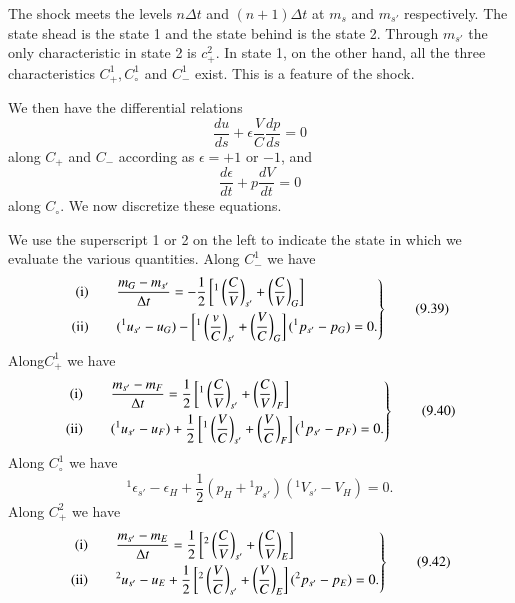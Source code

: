 The shock meets the levels $n\Delta t$ and $(n+1)\Delta t$ at $m_s$ and $m_{s'}$ respectively. The state shead is the state 1 and the state behind is the state 2. Through $m_{s'}$ the only characteristic in state 2 is $c^2_+$. In state 1, on the other hand, all the three characteristics $C^1_+, C^1_\circ$ and $C^1_-$ exist. This is a feature of the shock. 

We then have the differential relations
\begin{equation*}
\frac{du}{ds} + \epsilon \frac{V}{C} \frac{dp}{ds} = 0
\tag{9.37}\label{eq9.37}
\end{equation*}
along $C_+$ and $C_-$ according as $\epsilon = + 1$ or $-1$, and 
\begin{equation*}
\frac{d\epsilon}{dt} + p \frac{dV}{dt} = 0
\tag{9.38}\label{eq9.38}
\end{equation*}
along $C_\circ$. We now discretize these equations.

We use the superscript 1 or 2 on the left to indicate the state in which we evaluate the various quantities. Along $C^1_-$ we have
\begin{equation*}
\left. 
\begin{aligned}
{\rm (i)} & \qquad  \frac{m_G - m_{s'}}{\Delta t} = - \frac{1}{2}
\left[{}^1 \left(\frac{C}{V}\right)_{s'} + \left(\frac{C}{V}\right)_G \right]\\ 
{\rm (ii)} & \qquad ({}^1u_{s'} - u_G ) - \left[ {}^1
  \left(\frac{v}{C}\right)_{s'} + \left(\frac{V}{C}\right)_G \right]
({}^1 p_{s'} - p_G) = 0. 
\end{aligned}
\right\}
\tag{9.39}\label{eq9.39}
\end{equation*}
Along\pageoriginale $C^1_+$ we have 
\begin{equation*}
\left.
\begin{aligned}
{\rm (i)} & \qquad \frac{m_{s'} - m_F}{\Delta t} = \frac{1}{2}
\left[{}^1 \left(\frac{C}{V}\right)_{s'} + \left(\frac{C}{V}\right)_F
  \right]\\   
{\rm (ii)} & \qquad ({}^1 u_{s'} - u_F) + \frac{1}{2} \left[{}^1
  \left(\frac{V}{C}\right)_{s'} + \left(\frac{V}{C}\right)_F \right]
({}^1 p_{s'} - p_F) = 0. \\ 
\end{aligned}
\right\}\tag{9.40}\label{eq9.40}
\end{equation*}
Along $C^1_\circ$ we have 
\begin{equation*}
{}^1 \epsilon_{s'} - \epsilon_H + \frac{1}{2} (p_H + {}^1p_{s'} ) ({}^1 V_{s'} - V_H) = 0.  
\tag{9.41}\label{eq9.41}
\end{equation*}
Along $C^2_+$ we have 
\begin{equation*}
\left. 
\begin{aligned}
{\rm (i)} & \qquad \frac{m_{s'} - m_E}{\Delta t} = \frac{1}{2}
\left[{}^2 \left(\frac{C}{V}\right)_{s'} + \left(\frac{C}{V}\right)_E \right]\\ 
{\rm (ii)} & \qquad {}^2 u_{s'} - u_E + \frac{1}{2} \left[{}^2
  \left(\frac{V}{C}\right)_{s'} + \left(\frac{V}{C}\right)_E \right]
({}^2 p_{s'} - p_E) = 0. \\ 
\end{aligned}
\right\}\tag{9.42}\label{eq9.42}
\end{equation*}

